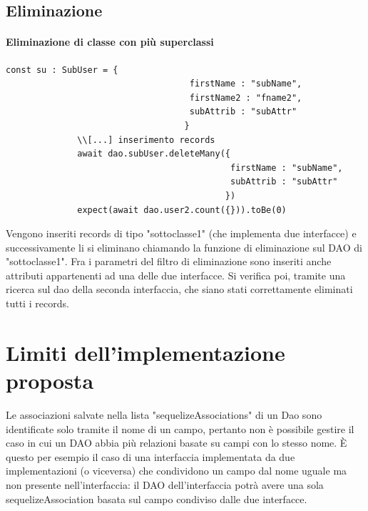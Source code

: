 \documentclass[a4paper, 12pt]{report}
\begin{document}
        \subsection{Eliminazione}
          \paragraph{Eliminazione di classe con più superclassi}
            \begin{Verbatim}[samepage=true]
              const su : SubUser = {
                                    firstName : "subName",
                                    firstName2 : "fname2",
                                    subAttrib : "subAttr"
                                   }
              \\[...] inserimento records
              await dao.subUser.deleteMany({
                                            firstName : "subName",
                                            subAttrib : "subAttr"
                                           })
              expect(await dao.user2.count({})).toBe(0)
            \end{Verbatim}
            Vengono inseriti records di tipo "sottoclasse1" (che implementa due interfacce) e successivamente li si eliminano chiamando la funzione di eliminazione sul DAO di "sottoclasse1".
            Fra i parametri del filtro di eliminazione sono inseriti anche attributi appartenenti ad una delle due interfacce.
            Si verifica poi, tramite una ricerca sul dao della seconda interfaccia, che siano stati correttamente eliminati tutti i records.
      \newpage
      \section{Limiti dell'implementazione proposta}
        Le associazioni salvate nella lista "sequelizeAssociations" di un Dao sono identificate solo tramite il nome di un campo, pertanto non è possibile gestire il caso in cui un DAO abbia più relazioni basate su campi con lo stesso nome.
        È questo per esempio il caso di una interfaccia implementata da due implementazioni (o viceversa) che condividono un campo dal nome uguale ma non presente nell'interfaccia: il DAO dell'interfaccia potrà avere una sola sequelizeAssociation basata sul campo condiviso dalle due interfacce.
\end{document}
